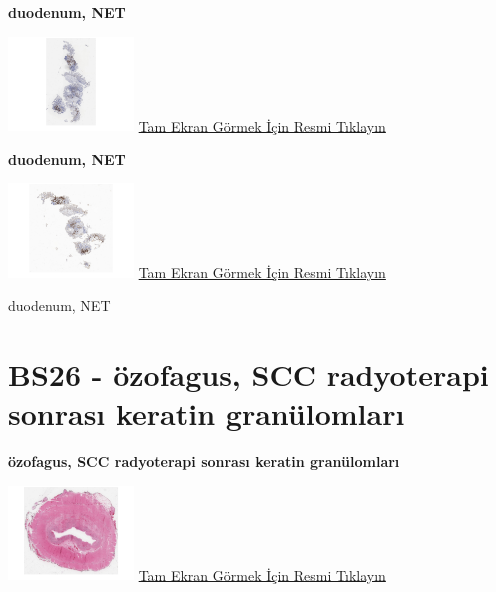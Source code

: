 \documentclass[
  letterpaper,
  DIV=11,
  numbers=noendperiod]{scrreprt}
\begin{document}
\textbf{duodenum, NET}

\href{https://images.patolojiatlasi.com/BS25/CHR.html}{\includegraphics[width=0.25\textwidth,height=\textheight]{./screenshots/thumbnail_BS25-CHR.png}}
\href{https://images.patolojiatlasi.com/BS25/CHR.html}{Tam Ekran Görmek
İçin Resmi Tıklayın}

\textbf{duodenum, NET}

\href{https://images.patolojiatlasi.com/BS25/SYN.html}{\includegraphics[width=0.25\textwidth,height=\textheight]{./screenshots/thumbnail_BS25-SYN.png}}
\href{https://images.patolojiatlasi.com/BS25/SYN.html}{Tam Ekran Görmek
İçin Resmi Tıklayın}

\begin{tcolorbox}[enhanced jigsaw, colbacktitle=quarto-callout-tip-color!10!white, colback=white, titlerule=0mm, opacityback=0, colframe=quarto-callout-tip-color-frame, opacitybacktitle=0.6, bottomrule=.15mm, breakable, coltitle=black, title=\textcolor{quarto-callout-tip-color}{\faLightbulb}\hspace{0.5em}{Tanı}, toprule=.15mm, toptitle=1mm, bottomtitle=1mm, arc=.35mm, rightrule=.15mm, leftrule=.75mm, left=2mm]

duodenum, NET

\end{tcolorbox}

\hypertarget{sec-BS26}{%
\section{BS26 - özofagus, SCC radyoterapi sonrası keratin
granülomları}\label{sec-BS26}}

\textbf{özofagus, SCC radyoterapi sonrası keratin granülomları}

\href{https://images.patolojiatlasi.com/BS26/HE.html}{\includegraphics[width=0.25\textwidth,height=\textheight]{./screenshots/thumbnail_BS26-HE.png}}
\href{https://images.patolojiatlasi.com/BS26/HE.html}{Tam Ekran Görmek
İçin Resmi Tıklayın}
\end{document}
